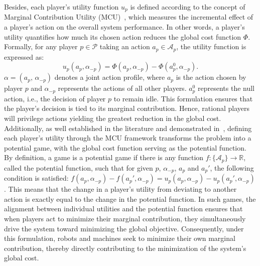 \documentclass[preprint, 3p, review, 12pt]{elsarticle}
\begin{document}
Besides, each player’s utility function $u_p$ is defined according to the concept of Marginal Contribution Utility (MCU)~\cite{9241495, chapman2009}, which measures the incremental effect of a player’s action on the overall system performance. In other words, a player’s utility quantifies how much its chosen action reduces the global cost function $\Phi$. Formally, for any player $p \in \mathcal{P}$ taking an action $a_p \in \mathcal{A}_p$, the utility function is expressed as:
\begin{equation}
    u_p(a_p, \alpha_{-p}) = \Phi(a_p, \alpha_{-p}) - \Phi(a_p^0, \alpha_{-p}).
\end{equation}
$\alpha = (a_p, \, \alpha_{-p})$ denotes a joint action profile, where $a_p$ is the action chosen by player $p$ and $\alpha_{-p}$ represents the actions of all other players. $a_p^0$ represents the null action, i.e., the decision of player $p$ to remain idle. This formulation ensures that the player’s decision is tied to its marginal contribution. Hence, rational players will privilege actions yielding the greatest reduction in the global cost. Additionally, as well established in the literature and demonstrated in~\cite{SANOGO2025111366}, defining each player’s utility through the MCU framework transforms the problem into a potential game, with the global cost function serving as the potential function. By definition, a game is a potential game if there is any function $f: \{\mathcal{A}_{p}\} \rightarrow \mathbb{R}$, called the potential function, such that for given $p$, $\alpha_{-p}$, $a_p$ and $a_p'$, the following condition is satisfied: $f(a_p,\alpha_{-p}) - f(a_p',\alpha_{-p}) = u_p(a_p,\alpha_{-p}) - u_p(a_p',\alpha_{-p})$. This means that the change in a player’s utility from deviating to another action is exactly equal to the change in the potential function. In such games, the alignment between individual utilities and the potential function ensures that when players act to minimize their marginal contribution, they simultaneously drive the system toward minimizing the global objective. Consequently, under this formulation, robots and machines seek to minimize their own marginal contribution, thereby directly contributing to the minimization of the system's global cost.
\end{document}
